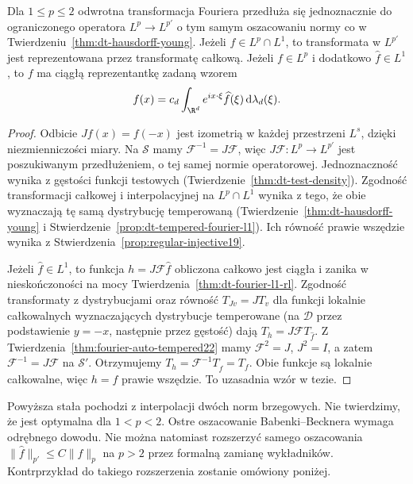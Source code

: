 \begin{wniosek}
\label{cor:dt-hy-inverse}
Dla $1\le p\le2$ odwrotna transformacja Fouriera
przedłuża się jednoznacznie do ograniczonego operatora
$L^p\to L^{p'}$ o tym samym oszacowaniu normy co
w Twierdzeniu~\ref{thm:dt-hausdorff-young}.
Jeżeli $f\in L^p\cap L^1$, to transformata w $L^{p'}$
jest reprezentowana przez transformatę całkową.
Jeżeli $f\in L^p$ i dodatkowo $\widehat f\in L^1$,
to $f$ ma ciągłą reprezentantkę zadaną wzorem
\[
 f(x)=c_d\int_{\R^d}e^{ix\cdot\xi}\widehat f(\xi)
 \,\mathrm d\lambda_d(\xi).
\]
\end{wniosek}
\begin{proof}
Odbicie $Jf(x)=f(-x)$ jest izometrią w każdej
przestrzeni $L^s$, dzięki niezmienniczości miary.
Na $\mathcal S$ mamy $\mathcal F^{-1}=J\mathcal F$,
więc $J\mathcal F:L^p\to L^{p'}$ jest poszukiwanym
przedłużeniem, o tej samej normie operatorowej.
Jednoznaczność wynika z gęstości funkcji testowych
(Twierdzenie~\ref{thm:dt-test-density}).
Zgodność transformacji całkowej i interpolacyjnej
na $L^p\cap L^1$ wynika z tego, że obie wyznaczają
tę samą dystrybucję temperowaną
(Twierdzenie~\ref{thm:dt-hausdorff-young} i
Stwierdzenie~\ref{prop:dt-tempered-fourier-l1}).
Ich równość prawie wszędzie wynika z
Stwierdzenia~\ref{prop:regular-injective19}.

Jeżeli $\widehat f\in L^1$, to funkcja
$h=J\mathcal F\widehat f$ obliczona całkowo jest
ciągła i zanika w nieskończoności na mocy
Twierdzenia~\ref{thm:dt-fourier-l1-rl}. Zgodność
transformaty z dystrybucjami oraz równość
$T_{Jv}=JT_v$ dla funkcji lokalnie całkowalnych
wyznaczających dystrybucje temperowane (na $\mathcal D$
przez podstawienie $y=-x$, następnie przez gęstość)
dają $T_h=J\mathcal FT_{\widehat f}$.
Z Twierdzenia~\ref{thm:fourier-auto-tempered22}
mamy $\mathcal F^2=J$, $J^2=I$, a zatem
$\mathcal F^{-1}=J\mathcal F$ na $\mathcal S'$.
Otrzymujemy $T_h=\mathcal F^{-1}T_{\widehat f}=T_f$.
Obie funkcje są lokalnie całkowalne, więc $h=f$
prawie wszędzie. To uzasadnia wzór w tezie.
\end{proof}

\begin{uwaga}
\label{rem:dt-hy-constant}
Powyższa stała pochodzi z interpolacji dwóch norm
brzegowych. Nie twierdzimy, że jest optymalna dla
$1<p<2$. Ostre oszacowanie Babenki--Becknera
wymaga odrębnego dowodu.
Nie można natomiast rozszerzyć samego oszacowania
$\|\widehat f\|_{p'}\le C\|f\|_p$ na $p>2$
przez formalną zamianę wykładników. Kontrprzykład
do takiego rozszerzenia zostanie omówiony poniżej.
\end{uwaga}

